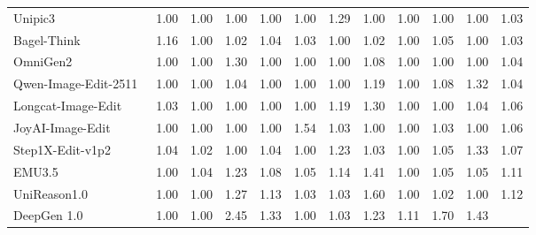 \begin{table}[t]
{\begin{tabular}{l|cccccccccc|c}
            Unipic3~\cite{wei2026skywork}
            & 1.00 & 1.00 & 1.00 & 1.00 & 1.00 & 1.29 & 1.00 & 1.00 & 1.00 & 1.00
            & \cellcolor[HTML]{C8C8C8}1.03 \\

            Bagel-Think~\cite{deng2025emerging}
            & 1.16 & 1.00 & 1.02 & 1.04 & 1.03 & 1.00 & 1.02 & 1.00 & 1.05 & 1.00
            & \cellcolor[HTML]{C8C8C8}1.03 \\

            OmniGen2~\cite{wu2025omnigen2}
            & 1.00 & 1.00 & 1.30 & 1.00 & 1.00 & 1.00 & 1.08 & 1.00 & 1.00 & 1.00
            & \cellcolor[HTML]{C8C8C8}1.04 \\

            Qwen-Image-Edit-2511~\cite{wu2025qwen}
            & 1.00 & 1.00 & 1.04 & 1.00 & 1.00 & 1.00 & 1.19 & 1.00 & 1.08 & 1.32
            & \cellcolor[HTML]{C8C8C8}1.04 \\

            Longcat-Image-Edit~\cite{team2025longcat}
            & 1.03 & 1.00 & 1.00 & 1.00 & 1.00 & 1.19 & 1.30 & 1.00 & 1.00 & 1.04
            & \cellcolor[HTML]{C8C8C8}1.06 \\
            
            JoyAI-Image-Edit~\cite{joyaiimage2026}
            & 1.00 & 1.00 & 1.00 & 1.00 & 1.54 & 1.03 & 1.00 & 1.00 & 1.03 & 1.00
            & \cellcolor[HTML]{C8C8C8} 1.06\\

            Step1X-Edit-v1p2~\cite{liu2025step1x}
            & 1.04 & 1.02 & 1.00 & 1.04 & 1.00 & 1.23 & 1.03 & 1.00 & 1.05 & 1.33
            & \cellcolor[HTML]{C8C8C8}1.07 \\
            
            EMU3.5~\cite{cui2025emu3}
            & 1.00 & 1.04 & 1.23 & 1.08 & 1.05 & 1.14 & 1.41 & 1.00 & 1.05 & 1.05
            & \cellcolor[HTML]{C8C8C8}1.11 \\   

            UniReason1.0~\cite{wang2026unireason}
            & 1.00 & 1.00 & 1.27 & 1.13 & 1.03 & 1.03 & 1.60 & 1.00 & 1.02 & 1.00
            & \cellcolor[HTML]{C8C8C8}1.12 \\

            DeepGen 1.0~\cite{wang2026deepgen}
            & 1.00 & 1.00 & 2.45 & 1.33 & 1.00 & 1.03 & 1.23 & 1.11 & 1.70 & 1.43
            & \cellcolor[HTML]{C8C8C8}{\color[HTML]{F88825}\textbf{1.33}} \\


\end{tabular}}
\end{table}
